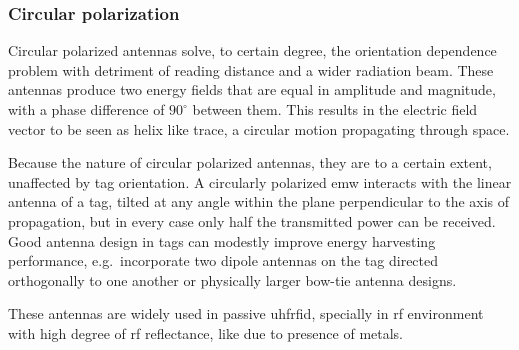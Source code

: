 \subsubsection{Circular polarization}

Circular polarized antennas solve, to certain degree, the orientation dependence problem with detriment of reading distance and a wider radiation beam.
These antennas produce two energy fields that are equal in amplitude and magnitude, with a phase difference of $90^\circ$ between them. This results in the electric field vector to be seen as helix like trace, a circular motion propagating through space. 

Because the nature of circular polarized antennas, they are to a certain extent, unaffected by tag orientation.
A circularly polarized \ac{emw} interacts with the linear antenna of a tag, tilted at any angle within the plane perpendicular to the axis of propagation, but in every case only half the transmitted power can be received.
Good antenna design in tags can modestly improve energy harvesting performance, e.g.\ incorporate two dipole antennas on the tag directed orthogonally to one another or physically larger bow-tie antenna designs.

These antennas are widely used in passive \ac{uhfrfid}, specially in \ac{rf} environment with high degree of \ac{rf} reflectance, like due to presence of metals.


\cleardoublepage